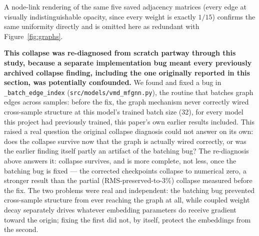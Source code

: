 \documentclass[journal]{IEEEtran}
\begin{document}
A node-link rendering of the same five saved adjacency matrices (every edge at visually indistinguishable opacity, since every weight is exactly $1/15$) confirms the same uniformity directly and is omitted here as redundant with Figure~\ref{fig:graphs}.

\textbf{This collapse was re-diagnosed from scratch partway through this study, because a separate implementation bug meant every previously archived collapse finding, including the one originally reported in this section, was potentially confounded.} We found and fixed a bug in \texttt{\_batch\_edge\_index} (\texttt{src/models/vmd\_mfgnn.py}), the routine that batches graph edges across samples: before the fix, the graph mechanism never correctly wired cross-sample structure at this model's trained batch size (32), for every model this project had previously trained, this paper's own earlier results included. This raised a real question the original collapse diagnosis could not answer on its own: does the collapse survive now that the graph is actually wired correctly, or was the earlier finding itself partly an artifact of the batching bug? The re-diagnosis above answers it: collapse survives, and is more complete, not less, once the batching bug is fixed --- the corrected checkpoints collapse to numerical zero, a stronger result than the partial (RMS-preserved-to-3\%) collapse measured before the fix. The two problems were real and independent: the batching bug prevented cross-sample structure from ever reaching the graph at all, while coupled weight decay separately drives whatever embedding parameters do receive gradient toward the origin; fixing the first did not, by itself, protect the embeddings from the second.
\end{document}
